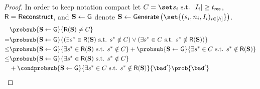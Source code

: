 \begin{proof}
	In order to keep notation compact let $C = \mdssCorrectSet$, $\mathsf{R} = \mathsf{Reconstruct}$, and $\mathbf{S} \gets \mathsf{G}$ denote $\mdssShareList \gets \mdssGenerate\left(\set{\mdssConfig{i}_{i \in [\mdssNumShareSets]}} \right)$.
	\begin{align}
		     & \probsub{\mdssShareList \gets \mdssG}{\mdssShortRecon(\mdssShareList) \neq \mdssCS }                                                                                                                                                                 \\
		=    & \probsub{\mdssShareList \gets \mdssG}{
			       \begin{gathered}
				       \left(\exists \mdssSecret^* \in \mdssShortRecon(\mdssShareList) \text{ s.t. } \mdssSecret^* \notin \mdssCS\right)
				       \vee
				       \left(\exists \mdssSecret^* \in \mdssCS \text{ s.t. } \mdssSecret^* \notin \mdssShortRecon(\mdssShareList)\right)
			       \end{gathered}}                                                                                                                                   \\
		\leq &
		\probsub{\mdssShareList \gets \mdssG}{
			\exists \mdssSecret^* \in \mdssShortRecon(\mdssShareList) \text{ s.t. } \mdssSecret^* \notin \mdssCS}
		+ \probsub{\mdssShareList \gets \mdssG}{\exists \mdssSecret^* \in \mdssCS \text{ s.t. } \mdssSecret^* \notin \mdssShortRecon(\mdssShareList)}        \label{eq:gs-corr-union}                                                                               \\
		\leq &
		\probsub{\mdssShareList \gets \mdssG}{
			\exists \mdssSecret^* \in \mdssShortRecon(\mdssShareList) \text{ s.t. } \mdssSecret^* \notin \mdssCS}
		\notag                                                                                                                                                                                                                                                      \\
		     & + \condprobsub{\mdssShareList \gets \mdssG}{\exists \mdssSecret^* \in \mdssCS \text{ s.t. } \mdssSecret^* \notin \mdssShortRecon(\mdssShareList)}{\bad'} \prob{\bad'}                                                                                            \notag \\ 

\end{align}
\end{proof}
